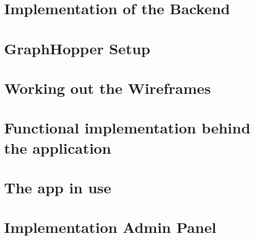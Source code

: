 \section{Implementation of the Backend}


\section{GraphHopper Setup}

\section{Working out the Wireframes}


\section{Functional implementation behind the application}


\section{The app in use}


\section{Implementation Admin Panel}
